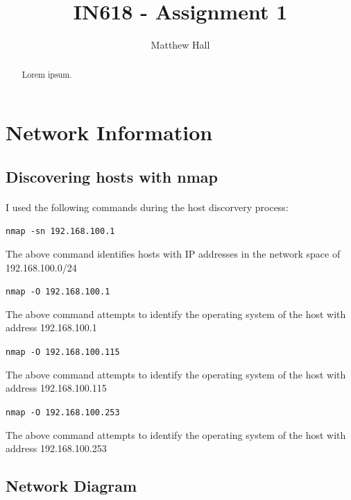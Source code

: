 \documentclass{article}
\title{IN618 - Assignment 1}
\author{Matthew Hall}
\date{}
\begin{document}
\maketitle
\renewcommand{\abstractname}{Executive Summary}
\begin{abstract}
Lorem ipsum.
\end{abstract}
\newpage
{}

\tableofcontents
\newpage

\section{Network Information}

\subsection{Discovering hosts with nmap}
\paragraph{}
I used the following commands during the host discorvery process:

\texttt{nmap -sn 192.168.100.1}

The above command identifies hosts with IP addresses in the network space of 192.168.100.0/24

\texttt{nmap -O 192.168.100.1}

The above command attempts to identify the operating system of the host with address 192.168.100.1

\texttt{nmap -O 192.168.100.115}

The above command attempts to identify the operating system of the host with address 192.168.100.115

\texttt{nmap -O 192.168.100.253}

The above command attempts to identify the operating system of the host with address 192.168.100.253

\subsection{Network Diagram}
\end{document}
